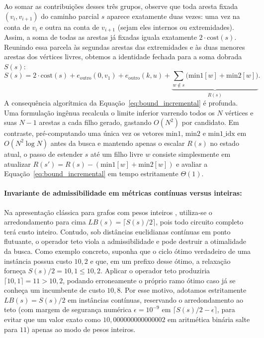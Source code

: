 Ao somar as contribuições desses três grupos, observe que toda aresta fixada $(v_i, v_{i+1})$
do caminho parcial $s$ aparece exatamente duas vezes: uma vez na conta de $v_i$ e outra na
conta de $v_{i+1}$ (sejam eles internos ou extremidades). Assim, a soma de todas as arestas já
fixadas iguala exatamente $2 \cdot \text{cost}(s)$. Reunindo essa parcela às segundas arestas
das extremidades e às duas menores arestas dos vértices livres, obtemos a identidade fechada
para a soma dobrada $S(s)$:
\begin{equation}
  S(s) = 2 \cdot \text{cost}(s) + e_{\text{outro}}(0, v_1) + e_{\text{outro}}(k, u)
         + \underbrace{\sum_{w \notin s} \bigl(\text{min1}[w] + \text{min2}[w]\bigr)}_{R(s)}.
  \label{eq:bound_incremental}
\end{equation}
A consequência algorítmica da Equação~\eqref{eq:bound_incremental} é profunda. Uma formulação
ingênua recalcula o limite inferior varrendo todos os $N$ vértices e suas $N - 1$ arestas a
cada filho gerado, gastando $O(N^2)$ por candidato. Em contraste, pré-computando uma única vez
os vetores $\text{min1}$, $\text{min2}$ e $\text{min1\_idx}$ em $O(N^2 \log N)$ antes da busca
e mantendo apenas o escalar $R(s)$ no estado atual, o passo de estender $s$ até um filho livre
$w$ consiste simplesmente em atualizar $R(s') = R(s) - (\text{min1}[w] + \text{min2}[w])$ e
avaliar a Equação~\eqref{eq:bound_incremental} em tempo estritamente \textbf{$\Theta(1)$}.

\paragraph{Invariante de admissibilidade em métricas contínuas versus inteiras:}
Na apresentação clássica para grafos com pesos inteiros \cite{levitin2012design}, utiliza-se o
arredondamento para cima $LB(s) = \lceil S(s)/2 \rceil$, pois todo circuito completo terá custo
inteiro. Contudo, sob distâncias euclidianas contínuas em ponto flutuante, o operador teto
viola a admissibilidade e pode destruir a otimalidade da busca. Como exemplo concreto, suponha
que o ciclo ótimo verdadeiro de uma instância possua custo $10{,}2$ e que, em um prefixo desse
ótimo, a relaxação forneça $S(s)/2 = 10{,}1 \le 10{,}2$. Aplicar o operador teto produziria
$\lceil 10{,}1 \rceil = 11 > 10{,}2$, podando erroneamente o próprio ramo ótimo caso já se
conheça um incumbente de custo $10{,}8$. Por esse motivo, adotamos estritamente
$LB(s) = S(s)/2$ em instâncias contínuas, reservando o arredondamento ao teto (com margem de
segurança numérica $\epsilon = 10^{-9}$ em $\lceil S(s)/2 - \epsilon \rceil$, para evitar que
um valor exato como $10{,}000000000000002$ em aritmética binária salte para $11$) apenas ao
modo de pesos inteiros.

